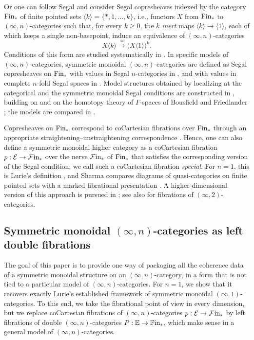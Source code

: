 \documentclass[10pt,reqno]{amsart}
\begin{document}
Or one can follow Segal \cite{Seg74} and consider Segal copresheaves
indexed by the category $\mathrm{Fin}_*$ of finite pointed sets
$\langle k\rangle=\{*,1,\ldots,k\}$, i.e., functors $X$ from
$\mathrm{Fin}_*$ to $(\infty,n)$-categories such that, for every $k\geq0$,
the $k$ \emph{inert} maps $\langle k\rangle\to\langle1\rangle$,
each of which keeps a single non-basepoint, induce an equivalence of
$(\infty,n)$-categories
\[
X\langle k\rangle\xrightarrow{\ \simeq\ }
\bigl(X\langle1\rangle\bigr)^{k}.
\]
Conditions of this form are studied systematically in
\cite{ChuHaugseng2021}. In specific models of
$(\infty,n)$-categories, symmetric monoidal $(\infty,n)$-categories
are defined as Segal copresheaves on $\mathrm{Fin}_*$ with values in Segal
$n$-categories in \cite{schommerpries2014dualizability}, and with
values in complete $n$-fold Segal spaces in
\cite{calaque2019cobordisms,johnsonfreyd2017oplax}. Model structures
obtained by localizing at the categorical and the symmetric monoidal
Segal conditions are constructed in \cite{gradypavlov2020locality},
building on \cite{Rezk2001,Rezk2010} and on the homotopy theory of
$\Gamma$-spaces of Bousfield and Friedlander
\cite{BousfieldFriedlander1978}; the models are compared in
\cite{GradyPavlov2026Bordisms,BarwickSchommerPries2021}.

Copresheaves on $\mathrm{Fin}_*$ correspond to coCartesian fibrations over
$\mathrm{Fin}_*$ through an appropriate straightening--unstraightening
correspondence \cite[\S3.2]{lurie2009higher}. Hence, one can also
define a symmetric monoidal higher category as a coCartesian fibration
$p:\mathcal E\to\mathcal{F}\mathrm{in}_*$ over the nerve $\mathcal{F}\mathrm{in}_*$ of $\mathrm{Fin}_*$ that
satisfies the corresponding version of the Segal condition; we call
such a coCartesian fibration \emph{special}. For $n=1$, this is
Lurie's definition \cite[Definition~2.0.0.7]{LurieHA}, and Sharma
compares diagrams of quasi-categories on finite pointed sets with a
marked fibrational presentation \cite{Sharma2021}. A
higher-dimensional version of this approach is pursued in
\cite{Nuiten2023}; see also \cite{GagnaHarpazLanari2024} for
fibrations of $(\infty,2)$-categories.

\subsection*{Symmetric monoidal $(\infty,n)$-categories as left double fibrations}
The goal of this paper is to provide one way of packaging all the
coherence data of a symmetric monoidal structure on an
$(\infty,n)$-category, in a form that is not tied to a particular
model of $(\infty,n)$-categories. For $n=1$, we show that it
recovers exactly Lurie's established framework of symmetric monoidal
$(\infty,1)$-categories. To this end, we take the fibrational point
of view in every dimension, but we replace coCartesian fibrations of
$(\infty,n)$-categories $p:\mathcal E\to\mathcal{F}\mathrm{in}_*$ by left fibrations
of double $(\infty,n)$-categories $P:\mathbb E\to\mathbb{F}\mathrm{in}_*$, which
make sense in a general model of $(\infty,n)$-categories.
\end{document}
